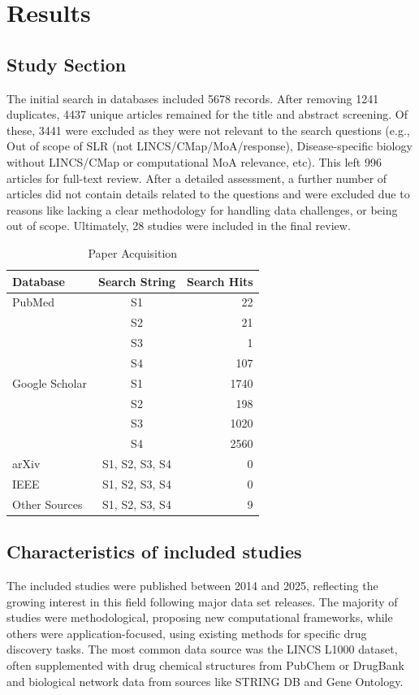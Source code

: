 \documentclass[twocolumn,12pt,a4paper]{article}
\begin{document}
\section{Results}
\subsection{Study Section}
The initial search in databases included 5678 records. After removing 1241 duplicates, 4437 unique articles remained for the title and abstract screening. Of these, 3441 were excluded as they were not relevant to the search questions (e.g., Out of scope of SLR (not LINCS/CMap/MoA/response), Disease-specific biology without LINCS/CMap or computational MoA relevance, etc). This left 996 articles for full-text review. After a detailed assessment, a further number of articles did not contain details related to the questions and were excluded due to reasons like lacking a clear methodology for handling data challenges, or being out of scope. Ultimately, 28 studies were included in the final review.
\begin{table}[htbp]
  \centering
  \caption{Paper Acquisition}
  \begin{tabular}{%
    l %
    c %
    r %
  }
    \toprule
    \textbf{Database} & \textbf{Search String} & \textbf{Search Hits} \\
    \midrule
    PubMed & S1 & 22 \\
    & S2 & 21 \\
    & S3 & 1 \\ 
    & S4 & 107 \\
    \addlinespace
    Google Scholar & S1 & 1740 \\
    & S2 & 198 \\
    & S3 & 1020 \\
    & S4 & 2560 \\
    \addlinespace
    arXiv & S1, S2, S3, S4 & 0 \\
    \addlinespace
    IEEE & S1, S2, S3, S4 & 0 \\
    \addlinespace
    Other Sources & S1, S2, S3, S4 & 9 \\
    \bottomrule
  \end{tabular}
\end{table}


\subsection{Characteristics of included studies}
The included studies were published between 2014 and 2025, reflecting the growing interest in this field following major data set releases. The majority of studies were methodological, proposing new computational frameworks, while others were application-focused, using existing methods for specific drug discovery tasks. The most common data source was the LINCS L1000 dataset, often supplemented with drug chemical structures from PubChem or DrugBank and biological network data from sources like STRING DB and Gene Ontology\cite{wang2016drug}.
\end{document}
